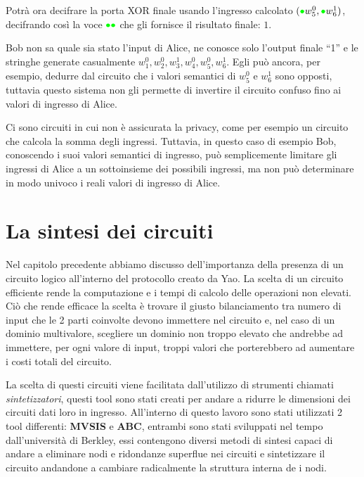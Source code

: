 \documentclass[
  italian,
]{book}
\begin{document}
Potrà ora decifrare la porta XOR finale usando l'ingresso calcolato \(({\color{green}\bullet}{}w_5^0,{\color{green}\bullet}{}w_6^1)\), decifrando così la voce \(\color{green}\bullet\color{green}\bullet\) che gli fornisce il risultato finale: \(1\).

Bob non sa quale sia stato l'input di Alice, ne conosce solo l'output finale ``1'' e le stringhe generate casualmente \(w_1^0,w_2^0,w_3^1,w_4^0,w_5^0,w_6^1\). Egli può ancora, per esempio, dedurre dal circuito che i valori semantici di \(w_5^0\) e \(w_6^1\) sono opposti, tuttavia questo sistema non gli permette di invertire il circuito confuso fino ai valori di ingresso di Alice.

Ci sono circuiti in cui non è assicurata la privacy, come per esempio un circuito che calcola la somma degli ingressi. Tuttavia, in questo caso di esempio Bob, conoscendo i suoi valori semantici di ingresso, può semplicemente limitare gli ingressi di Alice a un sottoinsieme dei possibili ingressi, ma non può determinare in modo univoco i reali valori di ingresso di Alice.

\hypertarget{la-sintesi-dei-circuiti}{%
\chapter{La sintesi dei circuiti}\label{la-sintesi-dei-circuiti}}

Nel capitolo precedente abbiamo discusso dell'importanza della presenza di un circuito logico all'interno del protocollo creato da Yao. La scelta di un circuito efficiente rende la computazione e i tempi di calcolo delle operazioni non elevati. Ciò che rende efficace la scelta è trovare il giusto bilanciamento tra numero di input che le 2 parti coinvolte devono immettere nel circuito e, nel caso di un dominio multivalore, scegliere un dominio non troppo elevato che andrebbe ad immettere, per ogni valore di input, troppi valori che porterebbero ad aumentare i costi totali del circuito.

La scelta di questi circuiti viene facilitata dall'utilizzo di strumenti chiamati \emph{sintetizzatori}, questi tool sono stati creati per andare a ridurre le dimensioni dei circuiti dati loro in ingresso. All'interno di questo lavoro sono stati utilizzati 2 tool differenti: \textbf{MVSIS} e \textbf{ABC}, entrambi sono stati sviluppati nel tempo dall'università di Berkley, essi contengono diversi metodi di sintesi capaci di andare a eliminare nodi e ridondanze superflue nei circuiti e sintetizzare il circuito andandone a cambiare radicalmente la struttura interna de i nodi.
\end{document}
